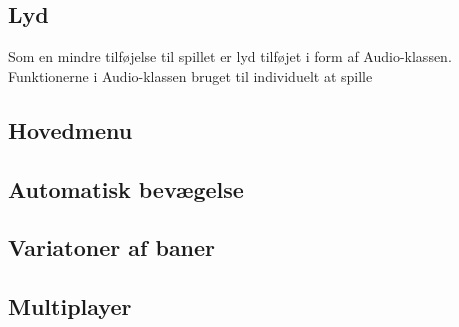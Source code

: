 \subsection{Lyd}

Som en mindre tilføjelse til spillet er lyd tilføjet i form af Audio-klassen. Funktionerne i Audio-klassen bruget til individuelt at spille 

\subsection{Hovedmenu}


\subsection{Automatisk bevægelse}

\subsection{Variatoner af baner}

\subsection{Multiplayer}
